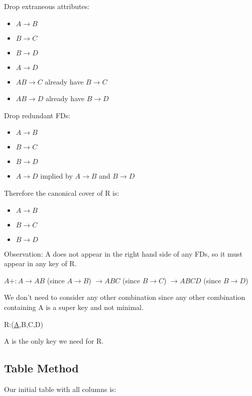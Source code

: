 \documentclass[a4paper]{article}
\begin{document}
Drop extraneous attributes:

\begin{itemize}
    \item $A \rightarrow B$
    \item $B \rightarrow C$
    \item $B \rightarrow D$
    \item $A \rightarrow D$
    \item \sout{$AB \rightarrow C$} already have $B \rightarrow C$
    \item \sout{$AB \rightarrow D$} already have $B \rightarrow D$
\end{itemize}

Drop redundant FDs:

\begin{itemize}
    \item $A \rightarrow B$
    \item $B \rightarrow C$
    \item $B \rightarrow D$
    \item \sout{$A \rightarrow D$} implied by $A \rightarrow B$ and $B \rightarrow D$
\end{itemize}

Therefore the canonical cover of R is:

\begin{itemize}
    \item $A \rightarrow B$
    \item $B \rightarrow C$
    \item $B \rightarrow D$
\end{itemize}

Observation: A does not appear in the right hand side of any FDs, so it must appear in any key of R.

$A+: A \rightarrow AB$ (since $A \rightarrow B$) $\rightarrow ABC$ (since $B \rightarrow C$) $\rightarrow ABCD$ (since $B \rightarrow D$)

We don't need to consider any other combination since any other combination containing A is a super key and not minimal.

R:(\underline{A},B,C,D)

A is the only key we need for R.

\subsection{Table Method}

Our initial table with all columns is:
\end{document}
